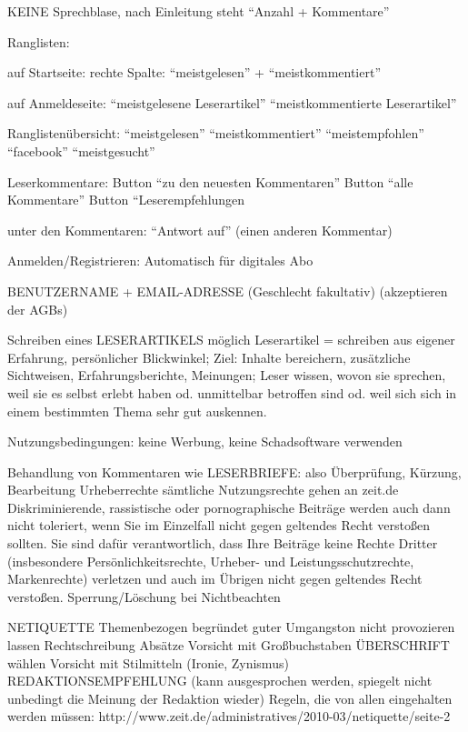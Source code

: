 KEINE Sprechblase, nach Einleitung steht ``Anzahl + Kommentare''

Ranglisten:

auf Startseite:
rechte Spalte: ``meistgelesen'' + ``meistkommentiert''

auf Anmeldeseite:
``meistgelesene Leserartikel''
``meistkommentierte Leserartikel''

Ranglistenübersicht:
``meistgelesen''
``meistkommentiert''
``meistempfohlen''
``facebook''
``meistgesucht''




Leserkommentare: 
Button ``zu den neuesten Kommentaren''
Button ``alle Kommentare''
Button ``Leserempfehlungen

unter den Kommentaren:
``Antwort auf'' (einen anderen Kommentar)


Anmelden/Registrieren:
Automatisch für digitales Abo

BENUTZERNAME + EMAIL-ADRESSE (Geschlecht fakultativ) (akzeptieren der AGBs)

Schreiben eines LESERARTIKELS möglich
Leserartikel = schreiben aus eigener Erfahrung, persönlicher Blickwinkel; Ziel: Inhalte bereichern, zusätzliche Sichtweisen, Erfahrungsberichte, Meinungen; Leser wissen, wovon sie sprechen, weil sie es selbst erlebt haben od. unmittelbar betroffen sind od. weil sich sich in einem bestimmten Thema sehr gut auskennen.


Nutzungsbedingungen:
keine Werbung, keine Schadsoftware verwenden

Behandlung von Kommentaren wie LESERBRIEFE: also Überprüfung, Kürzung, Bearbeitung
Urheberrechte
sämtliche Nutzungsrechte gehen an zeit.de
Diskriminierende, rassistische oder pornographische Beiträge werden auch dann nicht toleriert, wenn Sie im Einzelfall nicht gegen geltendes Recht verstoßen sollten.
Sie sind dafür verantwortlich, dass Ihre Beiträge keine Rechte Dritter (insbesondere Persönlichkeitsrechte, Urheber- und Leistungsschutzrechte, Markenrechte) verletzen und auch im Übrigen nicht gegen geltendes Recht verstoßen.
Sperrung/Löschung bei Nichtbeachten




NETIQUETTE
Themenbezogen
begründet
guter Umgangston 
nicht provozieren lassen
Rechtschreibung
Absätze
Vorsicht mit Großbuchstaben 
ÜBERSCHRIFT wählen
Vorsicht mit Stilmitteln (Ironie, Zynismus)
REDAKTIONSEMPFEHLUNG (kann ausgesprochen werden, spiegelt nicht unbedingt die Meinung der Redaktion wieder)
Regeln, die von allen eingehalten werden müssen:
http://www.zeit.de/administratives/2010-03/netiquette/seite-2



